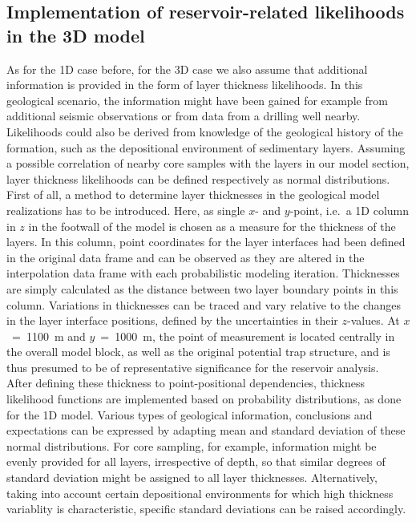 		\subsection{Implementation of reservoir-related likelihoods in the 3D model}
		As for the 1D case before, for the 3D case we also assume that additional information is provided in the form of layer thickness likelihoods. In this geological scenario, the information might have been gained for example from additional seismic observations or from data from a drilling well nearby. Likelihoods could also be derived from knowledge of the geological history of the formation, such as the depositional environment of sedimentary layers. Assuming a possible correlation of nearby core samples with the layers in our model section, layer thickness likelihoods can be defined respectively as normal distributions.\\
		First of all, a method to determine layer thicknesses in the geological model realizations has to be introduced. Here, as single $x$- and $y$-point, i.e.\ a 1D column in $z$ in the footwall of the model is chosen as a measure for the thickness of the layers. In this column, point coordinates for the layer interfaces had been defined in the original data frame and can be observed as they are altered in the interpolation data frame with each probabilistic modeling iteration. Thicknesses are simply calculated as the distance between two layer boundary points in this column. Variations in thicknesses can be traced and vary relative to the changes in the layer interface positions, defined by the uncertainties in their $z$-values. At $x$~=~1100~m and $y$~=~1000~m, the point of measurement is located centrally in the overall model block, as well as the original potential trap structure, and is thus presumed to be of representative significance for the reservoir analysis.\\
		After defining these thickness to point-positional dependencies, thickness likelihood functions are implemented based on probability distributions, as done for the 1D model. Various types of geological information, conclusions and expectations can be expressed by adapting mean and standard deviation of these normal distributions. For core sampling, for example, information might be evenly provided for all layers, irrespective of depth, so that similar degrees of standard deviation might be assigned to all layer thicknesses. Alternatively, taking into account certain depositional environments for which high thickness variablity is characteristic, specific standard deviations can be raised accordingly.\\
